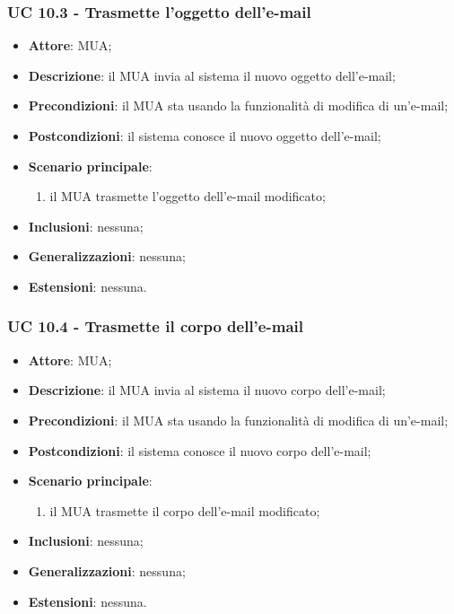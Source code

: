     \subsubsection{UC 10.3 - Trasmette l'oggetto dell'e-mail} \label{sec:UC10.3}
    \begin{itemize}
        \item \textbf{Attore}: MUA;
        \item \textbf{Descrizione}: il MUA invia al sistema il nuovo oggetto dell'e-mail;
        \item \textbf{Precondizioni}: il MUA sta usando la funzionalità di modifica di un'e-mail;
        \item \textbf{Postcondizioni}: il sistema conosce il nuovo oggetto dell'e-mail;
        \item \textbf{Scenario principale}:
            \begin{enumerate}
                \item il MUA trasmette l'oggetto dell'e-mail modificato;
            \end{enumerate}
        \item \textbf{Inclusioni}: nessuna;
        \item \textbf{Generalizzazioni}: nessuna;
        \item \textbf{Estensioni}: nessuna.
    \end{itemize}

    \subsubsection{UC 10.4 - Trasmette il corpo dell'e-mail} \label{sec:UC10.4}
    \begin{itemize}
        \item \textbf{Attore}: MUA;
        \item \textbf{Descrizione}: il MUA invia al sistema il nuovo corpo dell'e-mail;
        \item \textbf{Precondizioni}: il MUA sta usando la funzionalità di modifica di un'e-mail;
        \item \textbf{Postcondizioni}: il sistema conosce il nuovo corpo dell'e-mail;
        \item \textbf{Scenario principale}:
            \begin{enumerate}
                \item il MUA trasmette il corpo dell'e-mail modificato;
            \end{enumerate}
        \item \textbf{Inclusioni}: nessuna;
        \item \textbf{Generalizzazioni}: nessuna;
        \item \textbf{Estensioni}: nessuna.
    \end{itemize}

